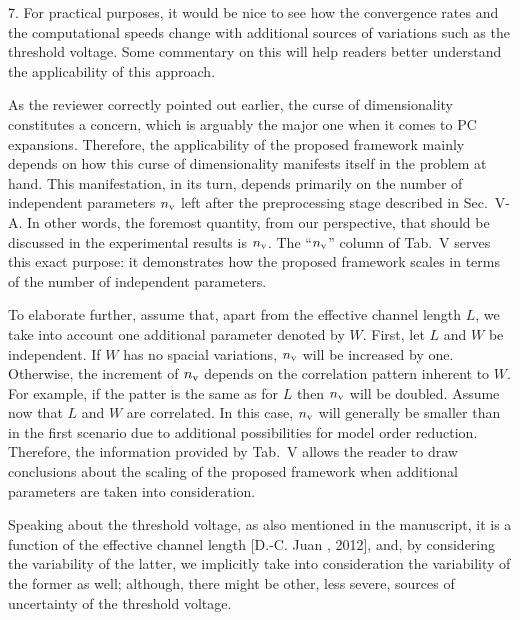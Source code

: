 \begin{reviewer}
7. For practical purposes, it would be nice to see how the convergence rates and the computational speeds change with additional sources of variations such as the threshold voltage. Some commentary on this will help readers better understand the applicability of this approach.
\end{reviewer}
\begin{authors}
As the reviewer correctly pointed out earlier, the curse of dimensionality constitutes a concern, which is arguably the major one when it comes to PC expansions.
Therefore, the applicability of the proposed framework mainly depends on how this curse of dimensionality manifests itself in the problem at hand.
This manifestation, in its turn, depends primarily on the number of independent parameters ${n_\text{v}}$ left after the preprocessing stage described in Sec.~V-A.
In other words, the foremost quantity, from our perspective, that should be discussed in the experimental results is ${n_\text{v}}$.
The ``${n_\text{v}}$'' column of Tab.~V serves this exact purpose: it demonstrates how the proposed framework scales in terms of the number of independent parameters.

To elaborate further, assume that, apart from the effective channel length $L$, we take into account one additional parameter denoted by $W$.
First, let $L$ and $W$ be independent.
If $W$ has no spacial variations, ${n_\text{v}}$ will be increased by one.
Otherwise, the increment of ${n_\text{v}}$ depends on the correlation pattern inherent to $W$.
For example, if the patter is the same as for $L$ then ${n_\text{v}}$ will be doubled.
Assume now that $L$ and $W$ are correlated.
In this case, ${n_\text{v}}$ will generally be smaller than in the first scenario due to additional possibilities for model order reduction.
Therefore, the information provided by Tab.~V allows the reader to draw conclusions about the scaling of the proposed framework when additional parameters are taken into consideration.

Speaking about the threshold voltage, as also mentioned in the manuscript, it is a function of the effective channel length [D.-C. Juan \etal, 2012], and, by considering the variability of the latter, we implicitly take into consideration the variability of the former as well; although, there might be other, less severe, sources of uncertainty of the threshold voltage.

\end{authors}
